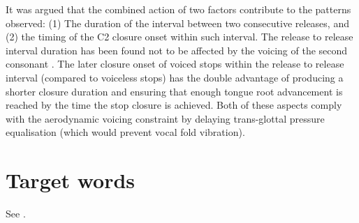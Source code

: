 \documentclass[12pt,]{article}
\begin{document}
It was argued that the combined action of two factors contribute to the
patterns observed: (1) The duration of the interval between two
consecutive releases, and (2) the timing of the C2 closure onset within
such interval. The release to release interval duration has been found
not to be affected by the voicing of the second consonant
\citep{coretta2018j}. The later closure onset of voiced stops within the
release to release interval (compared to voiceless stops) has the double
advantage of producing a shorter closure duration and ensuring that
enough tongue root advancement is reached by the time the stop closure
is achieved. Both of these aspects comply with the aerodynamic voicing
constraint \citep{ohala2011} by delaying trans-glottal pressure
equalisation (which would prevent vocal fold vibration).

\appendix

\hypertarget{target-words}{%
\section{Target words}\label{target-words}}

\label{a:targets}

See .



\end{document}

